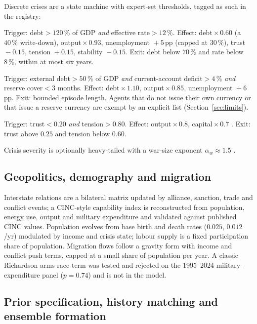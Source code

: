 \documentclass[12pt,a4paper]{article}
\begin{document}
Discrete crises are a state machine with expert-set thresholds, tagged as such in the registry:
\begin{description}\itemsep2pt
\item[Sovereign debt.] Trigger: debt${}>120\,\%$ of GDP \emph{and} effective rate${}>12\,\%$.
  Effect: debt${}\times0.60$ (a $40\,\%$ write-down), output${}\times0.93$, unemployment
  ${}+5$\,pp (capped at $30\,\%$), trust ${}-0.15$, tension ${}+0.15$, stability ${}-0.15$.
  Exit: debt below $70\,\%$ and rate below $8\,\%$, within at most six years.
\item[Currency.] Trigger: external debt${}>50\,\%$ of GDP \emph{and} current-account
  deficit${}>4\,\%$ \emph{and} reserve cover${}<3$ months. Effect: debt${}\times1.10$,
  output${}\times0.85$, unemployment ${}+6$\,pp. Exit: bounded episode length. Agents that do
  not issue their own currency or that issue a reserve currency are exempt by an explicit list
  (Section~\ref{sec:limits}).
\item[Regime collapse.] Trigger: trust${}<0.20$ \emph{and} tension${}>0.80$. Effect:
  output${}\times0.8$, capital${}\times0.7$ \citep{barro2008}. Exit: trust above $0.25$ and
  tension below $0.60$.
\end{description}
Crisis severity is optionally heavy-tailed with a war-size exponent $\alpha_w\approx1.5$
\citep{richardson1948,clauset2009}.

\subsection{Geopolitics, demography and migration}

Interstate relations are a bilateral matrix updated by alliance, sanction, trade and conflict
events; a CINC-style capability index \citep{singer1972} is reconstructed from population,
energy use, output and military expenditure \citep{sipri_milex} and validated against published
CINC values. Population evolves from base birth and death rates ($0.025$, $0.012$/yr) modulated
by income and crisis state; labour supply is a fixed participation share of population.
Migration flows follow a gravity form with income and conflict push terms, capped at a small
share of population per year. A classic Richardson arms-race term was tested and rejected on
the 1995--2024 military-expenditure panel ($p=0.74$) and is not in the model.

\subsection{Prior specification, history matching and ensemble formation}
\end{document}
